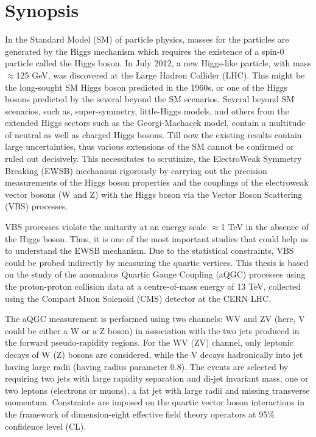\chapter*{Synopsis}
In the Standard Model (SM) of particle physics, masses for the particles are generated by the Higgs mechanism which requires the existence of a spin-0 particle called the Higgs boson. In July 2012, a new Higgs-like particle, with mass $\approx$125 GeV, was discovered at the Large Hadron Collider (LHC). This might be the long-sought SM Higgs boson predicted in the 1960s, or one of the Higgs bosons predicted by the several beyond the SM scenarios. Several beyond SM scenarios, such as, super-symmetry, little-Higgs models, and others from the extended Higgs sectors such as the Georgi-Machacek model, contain a multitude of neutral as well as charged Higgs bosons. Till now the existing results contain large uncertainties, thus various extensions of the SM cannot be confirmed or ruled out decisively.
This necessitates to scrutinize, the ElectroWeak Symmetry Breaking (EWSB) mechanism rigorously by carrying out the precision measurements of the Higgs boson properties and the couplings of the electroweak vector bosons (W and Z) with the Higgs boson via the Vector Boson Scattering (VBS) processes.

VBS processes violate the unitarity at an energy scale $\approx$1 TeV in the absence of the Higgs boson. Thus, it is one of the most important studies that could help us to understand the EWSB mechanism. Due to the statistical constraints, VBS could be probed indirectly by measuring the quartic vertices. This thesis is based on the study of the anomalous Quartic Gauge Coupling (aQGC) processes using the proton-proton collision data at a centre-of-mass energy of 13 TeV, collected using the Compact Muon Solenoid (CMS) detector at the CERN LHC.

The aQGC measurement is performed using two channels: WV and ZV (here, V could be either a W or a Z boson) in association with the two jets produced in the forward pseudo-rapidity regions. For the WV (ZV) channel, only leptonic decays of W (Z) bosons are considered, while the V decays hadronically into jet having large radii (having radius parameter 0.8). The events are selected by requiring two jets with large rapidity separation and di-jet invariant mass, one or two leptons (electrons or muons), a fat jet with large radii and missing transverse momentum. Constraints are imposed on the quartic vector boson interactions in the framework of dimension-eight effective field theory operators at 95\% confidence level (CL).

